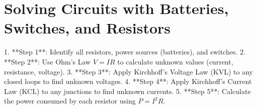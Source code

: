 \documentclass{article}
\begin{document}
\section*{Solving Circuits with Batteries, Switches, and Resistors}

1. **Step 1**: Identify all resistors, power sources (batteries), and switches.
2. **Step 2**: Use Ohm’s Law \(V = IR\) to calculate unknown values (current, resistance, voltage).
3. **Step 3**: Apply Kirchhoff’s Voltage Law (KVL) to any closed loops to find unknown voltages.
4. **Step 4**: Apply Kirchhoff’s Current Law (KCL) to any junctions to find unknown currents.
5. **Step 5**: Calculate the power consumed by each resistor using \(P = I^2 R\).
\end{document}
